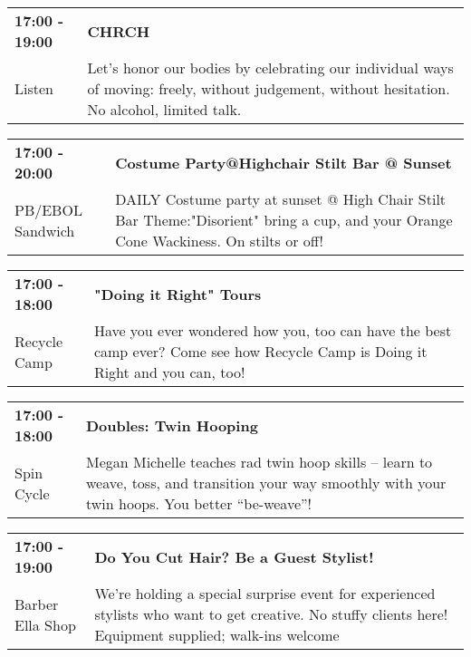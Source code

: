 \begin{tabular}{ p{1in} p{2.2in} }
    \textbf{17:00 - 19:00} & \textbf{CHRCH} \\
    Listen \newline  & Let's honor our bodies by celebrating our individual ways of moving: freely, without judgement, without hesitation. No alcohol, limited talk. \\
    \hline 
\end{tabular}
    
\begin{tabular}{ p{1in} p{2.2in} }
    \textbf{17:00 - 20:00} & \textbf{Costume Party@Highchair Stilt Bar @ Sunset} \\
    PB/EBOL Sandwich \newline  & DAILY Costume party at sunset @ High Chair Stilt Bar Theme:"Disorient" bring a cup, and your Orange Cone Wackiness. On stilts or off! \\
    \hline 
\end{tabular}
    
\begin{tabular}{ p{1in} p{2.2in} }
    \textbf{17:00 - 18:00} & \textbf{"Doing it Right" Tours} \\
    Recycle Camp \newline  & Have you ever wondered how you, too can have the best camp ever? Come see how Recycle Camp is Doing it Right and you can, too! \\
    \hline 
\end{tabular}
    
\begin{tabular}{ p{1in} p{2.2in} }
    \textbf{17:00 - 18:00} & \textbf{Doubles: Twin Hooping} \\
    Spin Cycle \newline  & Megan Michelle teaches rad twin hoop skills -- learn to weave, toss, and transition your way smoothly with your twin hoops. You better ``be-weave''! \\
    \hline 
\end{tabular}
    
\begin{tabular}{ p{1in} p{2.2in} }
    \textbf{17:00 - 19:00} & \textbf{Do You Cut Hair? Be a Guest Stylist!} \\
    Barber Ella Shop \newline  & We're holding a special surprise event for experienced stylists who want to get creative. No stuffy clients here! Equipment supplied; walk-ins welcome \\
    \hline 
\end{tabular}
    
